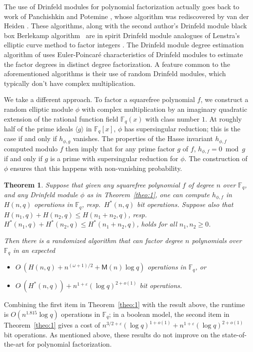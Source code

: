 \documentclass[12pt]{article}
\theoremstyle{plain}
\newtheorem{theorem}{Theorem}
\theoremstyle{definition}
\newcommand{\tildO}{O\tilde{~}}
\def\F{\ensuremath{\mathbb{F}}}
\def\MM{\ensuremath{\mathsf{M}}}
\begin{document}
The use of Drinfeld modules for polynomial factorization actually
goes back to work of Panchishkin and Potemine \cite{pp}, whose algorithm was
rediscovered by van der Heiden \cite{vdH}. These algorithms, along
with the second author's Drinfeld module black box Berlekamp
algorithm~\cite{nar} are in spirit Drinfeld module analogues of
Lenstra's elliptic curve method to factor integers \cite{len}. The
Drinfeld module degree estimation algorithm of \cite{nar} uses
Euler-Poincar\'e characteristics of Drinfeld modules to estimate the
factor degrees in distinct degree factorization. A feature common to
the aforementioned algorithms is their use of random Drinfeld modules,
which typically don't have complex multiplication.

We take a different approach. To factor a squarefree polynomial $f$,
we construct a random elliptic module $\phi$ with complex
multiplication by an imaginary quadratic extension of the rational
function field $\F_q(x)$ with class number $1$. At roughly half of the
prime ideals $\langle g \rangle$ in $\F_q[x]$, $\phi$ has
supersingular reduction; this is the case if and only if $h_{\phi,g}$
vanishes. The properties of the Hasse invariant $h_{\phi,f}$ computed
modulo $f$ then imply that for any prime factor $g$ of $f$,
$h_{\phi,f} = 0 \bmod g$ if and only if $g$ is a prime with
supersingular reduction for $\phi$. The construction of $\phi$ ensures
that this happens with non-vanishing probability.

\begin{theorem}
  \label{theo:main-factor}
  Suppose that given any squarefree polynomial $f$ of degree $n$ over
  $\F_q$, and any Drinfeld module $\phi$ as in Theorem~\ref{theo:1},
  one can compute $h_{\phi,f}$ in $H(n,q)$ operations in $\F_q$, resp.\
  $H^*(n,q)$ bit operations. Suppose also that $H(n_1,q)+H(n_2,q) \le
  H(n_1+n_2,q)$, resp.\ $H^*(n_1,q)+H^*(n_2,q) \le H^*(n_1+n_2,q)$, holds for
  all $n_1,n_2 \ge 0$.

  Then there is a randomized algorithm that can factor degree $n$
  polynomials over $\F_q$ in an expected
  \begin{itemize}
\item $\tildO(H(n,q)  + n^{(\omega+1)/2} + \MM(n)\log q )$ operations in $\F_q$, or
\item $\tildO(H^*(n,q)) + n^{1+\varepsilon}(\log q)^{2+o(1)}$ bit operations.
  \end{itemize}
\end{theorem}
Combining the first item in Theorem~\ref{theo:1} with the result
above, the runtime is $O(n^{1.815}\log q)$ operations in $\F_q$; in a
boolean model, the second item in Theorem~\ref{theo:1} gives a cost of
$n^{3/2+\varepsilon} (\log q)^{1 +o(1)} + n^{1+\varepsilon}(\log
q)^{2+o(1)}$ bit operations. As mentioned above, these results do not
improve on the state-of-the-art for polynomial factorization.
\end{document}
